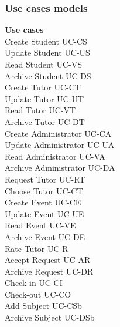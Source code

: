 \documentclass[12pt]{article}
\begin{document}
\subsubsection{Use cases models}
\textbf{Use cases}	\\		
			Create Student					UC-CS
			\\Update Student 				UC-US
			\\Read Student      			UC-VS
			\\Archive Student				UC-DS
			\\Create Tutor					UC-CT
			\\Update Tutor					UC-UT
			\\Read Tutor					UC-VT
			\\Archive Tutor					UC-DT
			\\Create Administrator	UC-CA %
			\\Update Administrator 				UC-UA %
			\\Read Administrator      			UC-VA %
			\\Archive Administrator				UC-DA %
			\\Request Tutor					UC-RT
			\\Choose Tutor					UC-CT
			\\Create Event					UC-CE %
			\\Update Event					UC-UE %
			\\Read Event					UC-VE %
			\\Archive Event					UC-DE %
			\\Rate Tutor					UC-R
			\\Accept Request				UC-AR
			\\Archive Request				UC-DR
			\\Check-in						UC-CI
			\\Check-out						UC-CO
			\\Add Subject					UC-CSb %
			\\Archive Subject				UC-DSb
			
\end{document}
